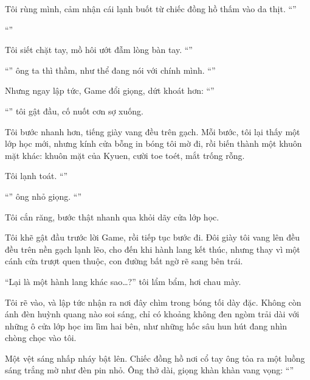 \documentclass[../main.tex]{subfiles}
\begin{document}
Tôi rùng mình, cảm nhận cái lạnh buốt từ chiếc đồng hồ thấm vào da thịt. ``''

``''

Tôi siết chặt tay, mồ hôi ướt đẫm lòng bàn tay. ``''

``'' ông ta thì thầm, như thể đang nói với chính mình. ``''

Nhưng ngay lập tức, Game đổi giọng, dứt khoát hơn: ``''

``'' tôi gật đầu, cố nuốt cơn sợ xuống.

Tôi bước nhanh hơn, tiếng giày vang đều trên gạch. Mỗi bước, tôi lại thấy một lớp học mới, nhưng kính cửa bỗng in bóng tôi mờ đi, rồi biến thành một khuôn mặt khác: khuôn mặt của Kyuen, cười toe toét, mắt trống rỗng.

Tôi lạnh toát. ``''

``'' ông nhỏ giọng. ``''

Tôi cắn răng, bước thật nhanh qua khỏi dãy cửa lớp học.

Tôi khẽ gật đầu trước lời Game, rồi tiếp tục bước đi. Đôi giày tôi vang lên đều đều trên nền gạch lạnh lẽo, cho đến khi hành lang kết thúc, nhưng thay vì một cánh cửa trượt quen thuộc, con đường bất ngờ rẽ sang bên trái.

``Lại là một hành lang khác sao\dots?'' tôi lẩm bẩm, hơi chau mày.

Tôi rẽ vào, và lập tức nhận ra nơi đây chìm trong bóng tối dày đặc. Không còn ánh đèn huỳnh quang nào soi sáng, chỉ có khoảng không đen ngòm trải dài với những ô cửa lớp học im lìm hai bên, như những hốc sâu hun hút đang nhìn chòng chọc vào tôi.

Một vệt sáng nhấp nháy bật lên. Chiếc đồng hồ nơi cổ tay ông tỏa ra một luồng sáng trắng mờ như đèn pin nhỏ. Ông thở dài, giọng khàn khàn vang vọng: ``''
\end{document}
